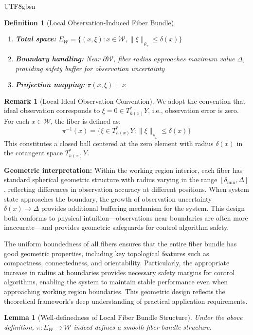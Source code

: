 \documentclass[a4paper,12pt]{extarticle}
\newtheorem{lemma}[theorem]{Lemma}
\newtheorem{definition}{Definition}
\theoremstyle{definition}
\newtheorem{remark}{Remark}
\begin{document}
\begin{CJK}{UTF8}{gbsn}
\begin{definition}[Local Observation-Induced Fiber Bundle]
\begin{enumerate}[label=(\arabic*)]
\begin{itemize}
   \item Boundary regularity: $\rho_x$ remains bounded and non-degenerate on $\partial \mathcal{W}$
   \end{itemize}
\item \textbf{Total space:} $E_{\mathcal{W}} = \{(x,\xi) : x \in \mathcal{W}, \|\xi\|_{\rho_x} \leq \delta(x)\}$
\item \textbf{Boundary handling:} Near $\partial \mathcal{W}$, fiber radius approaches maximum value $\Delta$, providing safety buffer for observation uncertainty
\item \textbf{Projection mapping:} $\pi(x, \xi) = x$
\end{enumerate}
\end{definition}

\begin{remark}[Local Ideal Observation Convention]
We adopt the convention that ideal observation corresponds to $\xi = 0 \in T^*_{h(x)}Y$, i.e., observation error is zero. For each $x \in \mathcal{W}$, the fiber is defined as:
$$\pi^{-1}(x) = \{\xi \in T^*_{h(x)}Y : \|\xi\|_{\rho_x} \leq \delta(x)\}$$
This constitutes a closed ball centered at the zero element with radius $\delta(x)$ in the cotangent space $T^*_{h(x)}Y$.

\textbf{Geometric interpretation:}
Within the working region interior, each fiber has standard spherical geometric structure with radius varying in the range $[\delta_{\min}, \Delta]$, reflecting differences in observation accuracy at different positions. When system state approaches the boundary, the growth of observation uncertainty $\delta(x) \to \Delta$ provides additional buffering mechanism for the system. This design both conforms to physical intuition—observations near boundaries are often more inaccurate—and provides geometric safeguards for control algorithm safety.

The uniform boundedness of all fibers ensures that the entire fiber bundle has good geometric properties, including key topological features such as compactness, connectedness, and orientability. Particularly, the appropriate increase in radius at boundaries provides necessary safety margins for control algorithms, enabling the system to maintain stable performance even when approaching working region boundaries. This geometric design reflects the theoretical framework's deep understanding of practical application requirements.
\end{remark}


\begin{lemma}[Well-definedness of Local Fiber Bundle Structure]
Under the above definition, $\pi: E_{\mathcal{W}} \to \mathcal{W}$ indeed defines a smooth fiber bundle structure.
\end{lemma}


\end{CJK}
\end{document}
